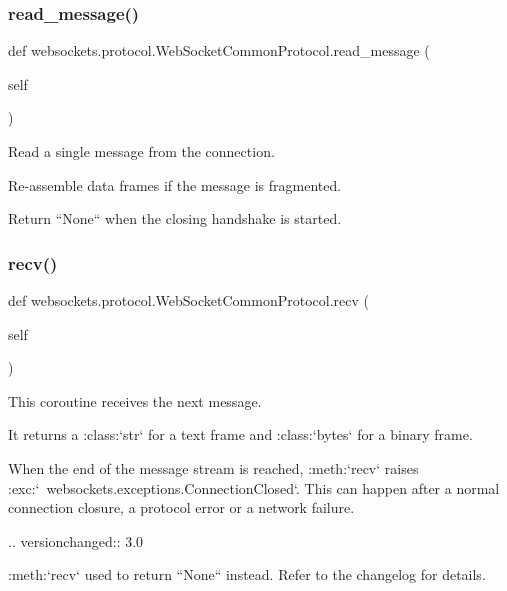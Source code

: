 \subsubsection{\texorpdfstring{read\+\_\+message()}{read\_message()}}
{\footnotesize\ttfamily def websockets.\+protocol.\+Web\+Socket\+Common\+Protocol.\+read\+\_\+message (\begin{DoxyParamCaption}\item[{}]{self }\end{DoxyParamCaption})}

\begin{DoxyVerb}Read a single message from the connection.

Re-assemble data frames if the message is fragmented.

Return ``None`` when the closing handshake is started.\end{DoxyVerb}
 \mbox{\label{classwebsockets_1_1protocol_1_1_web_socket_common_protocol_a98319d5e461fef80290790f0bfbb51f2}} 
\subsubsection{\texorpdfstring{recv()}{recv()}}
{\footnotesize\ttfamily def websockets.\+protocol.\+Web\+Socket\+Common\+Protocol.\+recv (\begin{DoxyParamCaption}\item[{}]{self }\end{DoxyParamCaption})}

\begin{DoxyVerb}This coroutine receives the next message.

It returns a :class:`str` for a text frame and :class:`bytes` for a
binary frame.

When the end of the message stream is reached, :meth:`recv` raises
:exc:`~websockets.exceptions.ConnectionClosed`. This can happen after
a normal connection closure, a protocol error or a network failure.

.. versionchanged:: 3.0

    :meth:`recv` used to return ``None`` instead. Refer to the
    changelog for details.\end{DoxyVerb}
 \mbox{\label{classwebsockets_1_1protocol_1_1_web_socket_common_protocol_a9eb8d78c5c3d633d9636ffd773de87ae}} 
